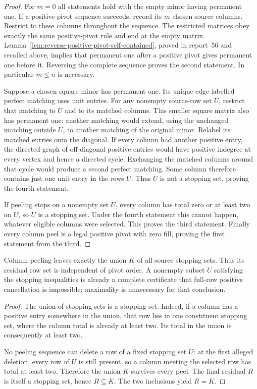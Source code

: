 \begin{proof}
For $m=0$ all statements hold with the empty minor having permanent one.
If a positive-pivot sequence succeeds, record its $m$ chosen source columns.
Restrict to these columns throughout the sequence.  The restricted matrices
obey exactly the same positive-pivot rule and end at the empty matrix.
Lemma~\ref{lem:reverse-positive-pivot-self-contained}, proved in report~56
and recalled above, implies that permanent one after a positive pivot gives
permanent one before it.  Reversing the complete sequence proves the second
statement.  In particular $m\le n$ is necessary.

Suppose a chosen square minor has permanent one.  Its unique edge-labelled
perfect matching uses unit entries.  For any nonempty source-row set $U$,
restrict that matching to $U$ and to its matched columns.  This smaller square
matrix also has permanent one: another matching would extend, using the
unchanged matching outside $U$, to another matching of the original minor.
Relabel its matched entries onto the diagonal.  If every column had another
positive entry, the directed graph of off-diagonal positive entries would
have positive indegree at every vertex and hence a directed cycle.  Exchanging
the matched columns around that cycle would produce a second perfect
matching.  Some column therefore contains just one unit entry in the rows
$U$.  Thus $U$ is not a stopping set, proving the fourth statement.

If peeling stops on a nonempty set $U$, every column has total zero or at
least two on $U$, so $U$ is a stopping set.  Under the fourth statement this
cannot happen, whatever eligible columns were selected.  This proves the
third statement.  Finally every column peel is a legal positive pivot with
zero fill, proving the first statement from the third.
\end{proof}

\begin{theorem}
\label{thm:stopping-core}
Column peeling leaves exactly the union $K$ of all source stopping sets.
Thus its residual row set is independent of pivot order.  A nonempty subset
$U$ satisfying the stopping inequalities is already a complete certificate
that full-row positive cancellation is impossible; maximality is unnecessary
for that conclusion.
\end{theorem}
\begin{proof}
The union of stopping sets is a stopping set.  Indeed, if a column has a
positive entry somewhere in the union, that row lies in one constituent
stopping set, where the column total is already at least two.  Its total in
the union is consequently at least two.

No peeling sequence can delete a row of a fixed stopping set $U$: at the
first alleged deletion, every row of $U$ is still present, so a column
meeting the selected row has total at least two.  Therefore the union $K$
survives every peel.  The final residual $R$ is itself a stopping set, hence
$R\subseteq K$.  The two inclusions yield $R=K$.
\end{proof}

